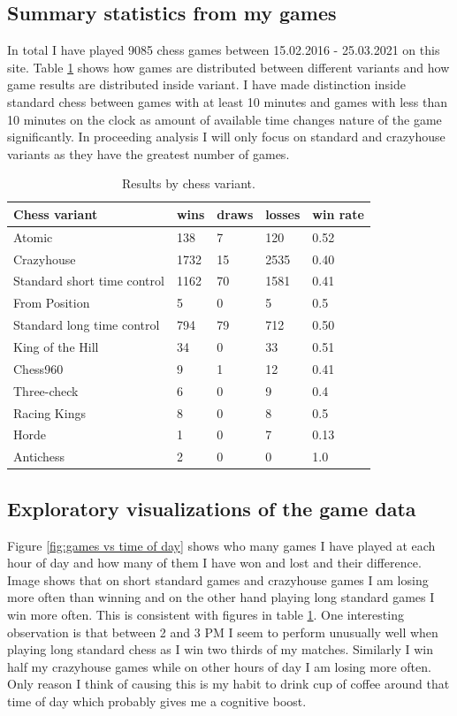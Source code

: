 \subsection{Summary statistics from my games}

In total I have played 9085 chess games between 15.02.2016 - 25.03.2021 on this site. Table \ref{tbl:results by variant} shows how games are distributed between different variants \cite{variants} and how game results are distributed inside variant. I have made distinction inside standard chess between games with at least 10 minutes and games with less than 10 minutes on the clock as amount of available time changes nature of the game significantly. In proceeding analysis I will only focus on standard and crazyhouse variants as they have the greatest number of games.

\begin{table}[ht]
    \centering
    \label{tbl:results by variant}
    \caption{Results by chess variant.}
    \begin{tabular}{lllll}
    Chess variant    & wins & draws & losses & win rate\\
    \hline
    Atomic& 138& 7& 120& 0.52 \\
    Crazyhouse& 1732& 15& 2535& 0.40 \\
    Standard short time control& 1162& 70& 1581& 0.41 \\
    From Position& 5& 0& 5& 0.5 \\
    Standard long time control& 794& 79& 712& 0.50 \\
    King of the Hill& 34& 0& 33& 0.51 \\
    Chess960& 9& 1& 12& 0.41 \\
    Three-check& 6& 0& 9& 0.4 \\
    Racing Kings& 8& 0& 8& 0.5 \\
    Horde& 1& 0& 7& 0.13 \\
    Antichess& 2& 0& 0& 1.0
    \end{tabular}
\end{table}


\subsection{Exploratory visualizations of the game data}

Figure \ref{fig:games vs time of day} shows who many games I have played at each hour of day and how many of them I have won and lost and their difference. Image shows that on short standard games and crazyhouse games I am losing more often than winning and on the other hand playing long standard games I win more often. This is consistent with figures in table \ref{tbl:results by variant}. One interesting observation is that between 2 and 3 PM I seem to perform unusually well when playing long standard chess as I win two thirds of my matches. Similarly I win half my crazyhouse games while on other hours of day I am losing more often. Only reason I think of causing this is my habit to drink cup of coffee around that time of day which probably gives me a cognitive boost. 



